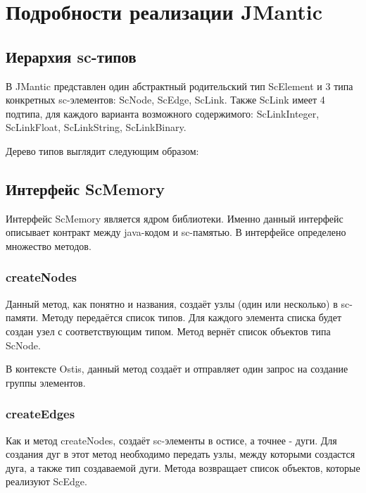 \section{Подробности реализации JMantic}

\subsection{Иерархия sc-типов}

В JMantic представлен один абстрактный родительский тип ScElement и 3 типа конкретных sc-элементов: ScNode, ScEdge, ScLink. Также ScLink имеет 4 подтипа, для каждого варианта возможного содержимого: ScLinkInteger, ScLinkFloat, ScLinkString, ScLinkBinary.

Дерево типов выглядит следующим образом: 



\subsection{Интерфейс ScMemory}
Интерфейс ScMemory является ядром библиотеки. Именно данный интерфейс описывает контракт между java-кодом и sc-памятью. В интерфейсе определено множество методов.
\subsubsection{createNodes}
Данный метод, как понятно и названия, создаёт узлы (один или несколько) в sc-памяти. Методу передаётся список типов. Для каждого элемента списка будет создан узел с соответствующим типом. Метод вернёт список объектов типа ScNode. 

В контексте Ostis, данный метод создаёт и отправляет один запрос на создание группы элементов. 

\subsubsection{createEdges}
Как и метод createNodes, создаёт sc-элементы в остисе, а точнее - дуги. Для создания дуг в этот метод необходимо передать узлы, между которыми создастся дуга, а также тип создаваемой дуги. Метода возвращает список объектов, которые реализуют ScEdge. 

